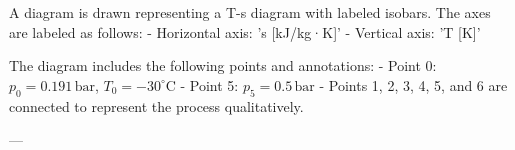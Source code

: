 A diagram is drawn representing a T-s diagram with labeled isobars. The axes are labeled as follows:  
- Horizontal axis: 's [kJ/kg·K]'  
- Vertical axis: 'T [K]'  

The diagram includes the following points and annotations:  
- Point 0: \( p_0 = 0.191 \, \text{bar} \), \( T_0 = -30^\circ \text{C} \)  
- Point 5: \( p_5 = 0.5 \, \text{bar} \)  
- Points 1, 2, 3, 4, 5, and 6 are connected to represent the process qualitatively.  

---